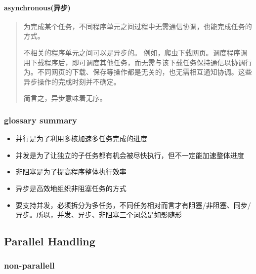 \documentclass[11pt]{article}
\providecommand{\tightlist}{%
      \setlength{\itemsep}{0pt}\setlength{\parskip}{0pt}}
\begin{document}
    \hypertarget{asynchronousux5f02ux6b65}{%
\paragraph{asynchronous(异步)}\label{asynchronousux5f02ux6b65}}

\begin{quote}
为完成某个任务，不同程序单元之间过程中无需通信协调，也能完成任务的方式。

不相关的程序单元之间可以是异步的。
例如，爬虫下载网页。调度程序调用下载程序后，即可调度其他任务，而无需与该下载任务保持通信以协调行为。不同网页的下载、保存等操作都是无关的，也无需相互通知协调。这些异步操作的完成时刻并不确定。

简言之，异步意味着无序。
\end{quote}

    \hypertarget{glossary-summary}{%
\subsubsection{glossary summary}\label{glossary-summary}}

\begin{itemize}
\tightlist
\item
  并行是为了利用多核加速多任务完成的进度
\item
  并发是为了让独立的子任务都有机会被尽快执行，但不一定能加速整体进度
\item
  非阻塞是为了提高程序整体执行效率
\item
  异步是高效地组织非阻塞任务的方式
\item
  要支持并发，必须拆分为多任务，不同任务相对而言才有阻塞/非阻塞、同步/异步。所以，并发、异步、非阻塞三个词总是如影随形
\end{itemize}

    \hypertarget{parallel-handling}{%
\subsection{Parallel Handling}\label{parallel-handling}}

    \hypertarget{non-parallell}{%
\subsubsection{non-parallell}\label{non-parallell}}
\end{document}
